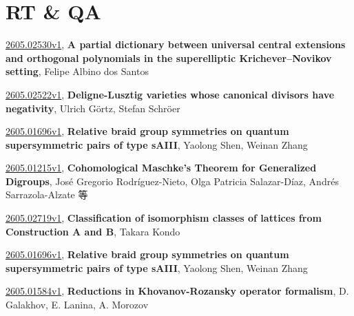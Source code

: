 \documentclass[9pt, a4paper]{article}
\theoremstyle{plain}
\theoremstyle{definition}
\theoremstyle{remark}
\newcommand{\arxiv}[3]{\href{https://arxiv.org/abs/#1}{#1}, \textbf{\textcolor{arxivblue}{#2}}, #3}
\begin{document}

\section{RT \& QA}
\arxiv{2605.02530v1}{A partial dictionary between universal central extensions and orthogonal polynomials in the superelliptic Krichever--Novikov setting}{Felipe Albino dos Santos}

\arxiv{2605.02522v1}{Deligne-Lusztig varieties whose canonical divisors have negativity}{Ulrich Görtz, Stefan Schröer}

\arxiv{2605.01696v1}{Relative braid group symmetries on quantum supersymmetric pairs of type sAIII}{Yaolong Shen, Weinan Zhang}

\arxiv{2605.01215v1}{Cohomological Maschke's Theorem for Generalized Digroups}{José Gregorio Rodríguez-Nieto, Olga Patricia Salazar-Díaz, Andrés Sarrazola-Alzate 等}

\arxiv{2605.02719v1}{Classification of isomorphism classes of lattices from Construction A and B}{Takara Kondo}

\arxiv{2605.01696v1}{Relative braid group symmetries on quantum supersymmetric pairs of type sAIII}{Yaolong Shen, Weinan Zhang}

\arxiv{2605.01584v1}{Reductions in Khovanov-Rozansky operator formalism}{D. Galakhov, E. Lanina, A. Morozov}

\end{document}
